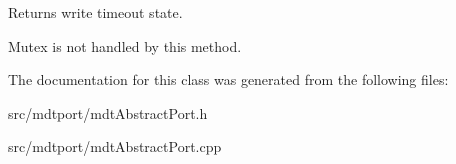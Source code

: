 Returns write timeout state. 

Mutex is not handled by this method. 

The documentation for this class was generated from the following files:\begin{DoxyCompactItemize}
\item 
src/mdtport/mdtAbstractPort.h\item 
src/mdtport/mdtAbstractPort.cpp\end{DoxyCompactItemize}
